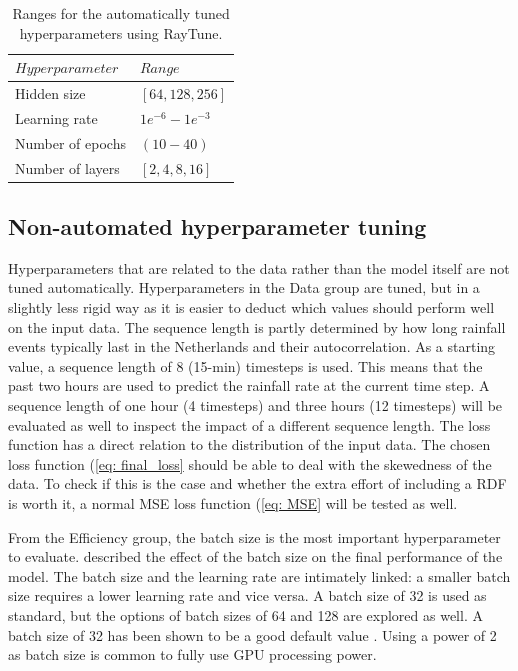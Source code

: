 \documentclass[twocolumn, 10pt, a4paper]{memoir}
\begin{document}
	\begin{table}
		\caption{Ranges for the automatically tuned hyperparameters using RayTune.}
		\label{tab: raytunetable}
		\centering
		\renewcommand{\arraystretch}{1.5}
		\begin{tabular}{p{2.5cm}p{4.2cm}}
			\hline
			$Hyperparameter$&$Range$\\
			\hline
			Hidden size&$[64,128,256]$\\
			Learning rate&$1e^{-6} - 1e^{-3}$\\
			Number of epochs&$(10 - 40)$\\
			Number of layers&$[2,4,8,16]$\\
			\hline
		\end{tabular}
	\end{table}
	
	\subsection{Non-automated hyperparameter tuning} \label{Nonauto tuning}
	Hyperparameters that are related to the data rather than the model itself are not tuned automatically. Hyperparameters in the Data group are tuned, but in a slightly less rigid way as it is easier to deduct which values should perform well on the input data.
	The sequence length is partly determined by how long rainfall events typically last in the Netherlands and their autocorrelation. As a starting value, a sequence length of 8 (15-min) timesteps is used. This means that the past two hours are used to predict the rainfall rate at the current time step. A sequence length of one hour (4 timesteps) and three hours (12 timesteps) will be evaluated as well to inspect the impact of a different sequence length.
	The loss function has a direct relation to the distribution of the input data. The chosen loss function (\ref{eq: final_loss} should be able to deal with the skewedness of the data. To check if this is the case and whether the extra effort of including a RDF is worth it, a normal MSE loss function (\ref{eq: MSE} will be tested as well.
	
	From the Efficiency group, the batch size is the most important hyperparameter to evaluate. described the effect of the batch size on the final performance of the model. The batch size and the learning rate are intimately linked: a smaller batch size requires a lower learning rate and vice versa. A batch size of 32 is used as standard, but the options of batch sizes of 64 and 128 are explored as well. A batch size of 32 has been shown to be a good default value \cite{Bengio2012}. Using a power of 2 as batch size is common to fully use GPU processing power.
	
\end{document}
